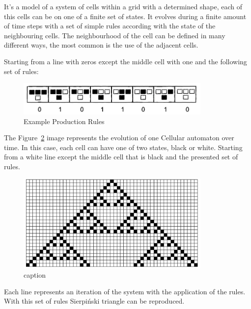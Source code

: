 It's a model of a system of cells within a grid with a determined shape, each of this cells can be on one of a finite set of states. It evolves during a finite amount of time steps with a set of simple rules according with the state of the neighbouring cells.
The neighbourhood of the cell can be defined in many different ways, the most common is the use of the adjacent cells.

Starting from a line with zeros except the middle cell with one and the following set of rules:

\begin{figure}[htbp]
	\centering
	\includegraphics[width=0.85\textwidth]{img/Theory/Cellular_A/Rules.png}
	\caption{Example Production Rules\cite{Shiffman2012}}
	\label{fig:label}
\end{figure}



The Figure~\ref{fig:resultCA} image represents the evolution of one Cellular automaton over time.  In this case, each cell can have one of two states, black or white. Starting from a white line except the middle cell that is black and the presented set of rules.

\begin{figure}[htbp]
    \centering
    \includegraphics[width=0.85\textwidth]{img/Theory/Cellular_A/Result.png}
    \caption{caption}
    \label{fig:resultCA}
\end{figure}



Each line represents an iteration of the system with the application of the rules. With this set of rules Sierpiński triangle can be reproduced. 



